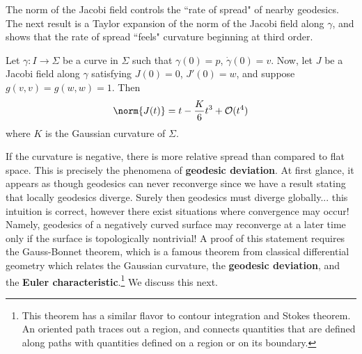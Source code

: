 %
The norm of the Jacobi field controls the ``rate of spread" of nearby geodesics. The next result is a Taylor expansion of the norm of the Jacobi field along $\gamma$, and shows that the rate of spread ``feels" curvature beginning at third order.
%
\begin{theorem}[]\label{thm:geodesic-deviation}
Let $\gamma: I \to \Sigma$ be a curve in $\Sigma$ such that $\gamma(0)=p$, $\dot{\gamma}(0) = v$. Now, let $J$ be a Jacobi field along $\gamma$ satisfying $J(0)=0$, $J'(0)=w$, and suppose $g(v,v)=g(w,w)=1$. Then
\begin{equation}\label{}
\norm{J(t)} = t - \frac{K}{6}t^3 + \order(t^4)
\end{equation}
where $K$ is the Gaussian curvature of $\Sigma$.
\end{theorem}
If the curvature is negative, there is more relative spread than compared to flat space.
This is precisely the phenomena of \textbf{geodesic deviation}.
At first glance, it appears as though geodesics can never reconverge since we have a result stating that locally geodesics diverge.
Surely then geodesics must diverge globally... this intuition is correct, however there exist situations where convergence may occur!
Namely, geodesics of a negatively curved surface may reconverge at a later time only if the surface is topologically nontrivial!
A proof of this statement requires the Gauss-Bonnet theorem, which is a famous theorem from classical differential geometry which relates the Gaussian curvature, the \textbf{geodesic deviation}, and the \textbf{Euler characteristic}.\footnote{This theorem has a similar flavor to contour integration and Stokes theorem. An oriented path traces out a region, and connects quantities that are defined along paths with quantities defined on a region or on its boundary.} We discuss this next.
